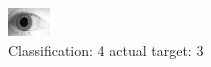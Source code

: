 \begin{figure}[h!]
\begin{center}
\includegraphics[width=0.60\columnwidth]{figures/ID1915_class_4_target_3.png}
\end{center}
\caption{ Classification: 4 actual target: 3}
\label{fig:ID1915_class_4_target_3}
\end{figure}
